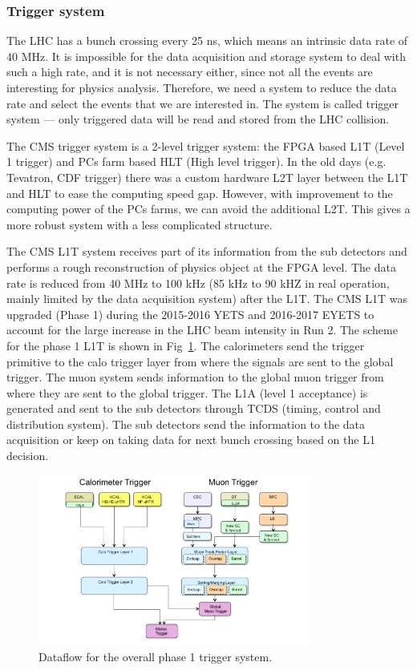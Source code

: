 \subsubsection{Trigger system}

The LHC has a bunch crossing every 25 ns, which means an intrinsic data rate of 40 MHz. It is impossible for the data acquisition and storage system to deal with such a high rate, and it is not necessary either, since not all the events are interesting for physics analysis. Therefore, we need a system to reduce the data rate and select the events that we are interested in. The system is called trigger system --- only triggered data will be read and stored from the LHC collision. 

The CMS trigger system is a 2-level trigger system: the FPGA based L1T (Level 1 trigger) and PCs farm based HLT (High level trigger). In the old days (e.g. Tevatron, CDF trigger) there was a custom hardware L2T layer between the L1T and HLT to ease the computing speed gap. However, with improvement to the computing power of the PCs farms, we can avoid the additional L2T. This gives a more robust system with a less complicated structure. 

The CMS L1T system receives part of its information from the sub detectors and performs a rough reconstruction of physics object at the FPGA level. The data rate is reduced from 40 MHz to 100 kHz (85 kHz to 90 kHZ in real operation, mainly limited by the data acquisition system) after the L1T. The CMS L1T was upgraded (Phase 1) during the 2015-2016 YETS and 2016-2017 EYETS to account for the large increase in the LHC beam intensity in Run 2. The scheme for the phase 1 L1T is shown in Fig~\ref{fig:c3cmsl1scheme}. The calorimeters send the trigger primitive to the calo trigger layer from where the signals are sent to the global trigger. The muon system sends information to the global muon trigger from where they are sent to the global trigger. The L1A (level 1 acceptance) is generated and sent to the sub detectors through TCDS (timing, control and distribution system). The sub detectors send the information to the data acquisition or keep on taking data for next bunch crossing based on the L1 decision. 

\begin{figure}[htbp]
 \begin{center}
  \includegraphics[width=0.8\textwidth]{figures/c3/c3_cms_l1scheme.png}
 \end{center}
 \caption{Dataflow for the overall phase 1 trigger system.}
 \label{fig:c3cmsl1scheme}
\end{figure}


